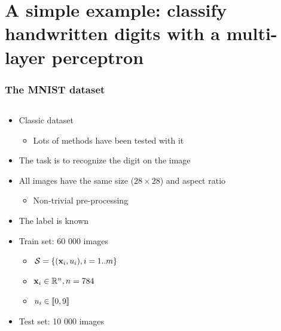 \section{A simple example: classify handwritten digits with a multi-layer
  perceptron}

\begin{frame}
  \frametitle{The MNIST dataset}
  \begin{columns}
    \begin{column}{0.5\textwidth}
      \begin{itemize}
      \item Classic dataset
        \begin{itemize}
        \item Lots of methods have been tested with it
        \end{itemize}
      \item The task is to recognize the digit on the image
      \item<2-> All images have the same size ($28 \times 28$) and aspect ratio
        \begin{itemize}
        \item Non-trivial pre-processing
        \end{itemize}
      \item<2-> The label is known
      \item<3-> Train set: 60 000 images
        \begin{itemize}
        \item $\mathcal{S} =
          \left \lbrace {\ensuremath{\left ( {\mathbf{x}_{i}}, {u_{i}} \right )}} , {i=1..m} \right \rbrace$
        \item $\mathbf{x}_i \in \mathbb{R}^{n}, n = 784$
        \item $u_i \in \left \llbracket {0}, {9} \right \rrbracket$
        \end{itemize}
      \item<3-> Test set: 10 000 images
      \end{itemize}
    \end{column}
    \begin{column}{0.5\textwidth}
\end{column}
\end{columns}
\end{frame}
